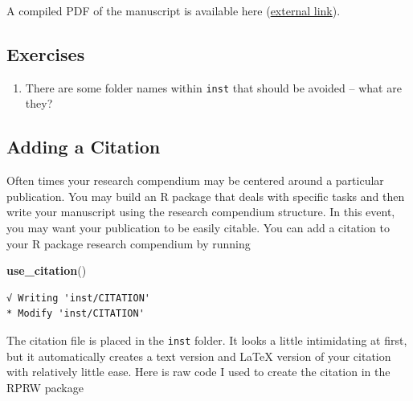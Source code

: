 \documentclass[
]{book}
\newenvironment{Shaded}{\begin{snugshade}}{\end{snugshade}}
\newcommand{\KeywordTok}[1]{\textcolor[rgb]{0.13,0.29,0.53}{\textbf{#1}}}
\newcommand{\NormalTok}[1]{#1}
\providecommand{\tightlist}{%
  \setlength{\itemsep}{0pt}\setlength{\parskip}{0pt}}
\begin{document}
A compiled PDF of the manuscript is available here (\href{https://github.com/michaeldumelle/RPRW/blob/main/inst/manuscript/manuscript.pdf}{external link}).

\hypertarget{ex-set9}{%
\subsection{Exercises}\label{ex-set9}}

\begin{enumerate}
\def\labelenumi{\arabic{enumi}.}
\tightlist
\item
  There are some folder names within \texttt{inst} that should be avoided -- what are they?
\end{enumerate}

\hypertarget{citation}{%
\subsection{Adding a Citation}\label{citation}}

Often times your research compendium may be centered around a particular publication. You may build an R package that deals with specific tasks and then write your manuscript using the research compendium structure. In this event, you may want your publication to be easily citable. You can add a citation to your R package research compendium by running

\begin{Shaded}
\begin{Highlighting}[]
\KeywordTok{use_citation}\NormalTok{()}
\end{Highlighting}
\end{Shaded}

\begin{verbatim}
√ Writing 'inst/CITATION'
* Modify 'inst/CITATION'
\end{verbatim}

The citation file is placed in the \texttt{inst} folder. It looks a little intimidating at first, but it automatically creates a text version and LaTeX version of your citation with relatively little ease. Here is raw code I used to create the citation in the RPRW package
\end{document}
